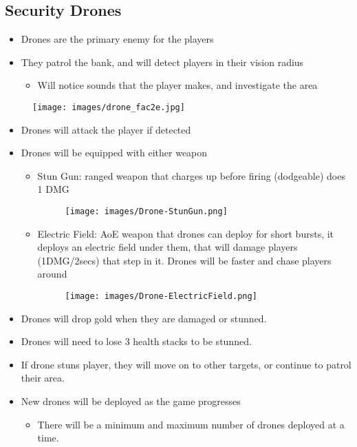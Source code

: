 \documentclass[10pt]{report}
\begin{document}
\subsection{Security Drones}

\begin{minipage}{.8\linewidth}
    \begin{itemize}
        \item Drones are the primary enemy for the players
        \item They patrol the bank, and will detect players in their vision radius
        \begin{itemize}
            \item Will notice sounds that the player makes, and investigate the area 
        \end{itemize}
    \end{itemize}
\end{minipage} \hfill
\begin{minipage}{.18\linewidth}
    \begin{figure}[H]
        \centering
        \texttt{[image: images/drone\_fac2e.jpg]}
        \caption{}
    \end{figure}
\end{minipage}
\begin{itemize}
    \item Drones will attack the player if detected
    \item Drones will be equipped with either weapon                    
    \begin{itemize}
        \item Stun Gun: ranged weapon that charges up before firing (dodgeable) does 1 DMG
        \begin{figure}[H]
            \centering
            \texttt{[image: images/Drone-StunGun.png]}
        \end{figure}
        \item Electric Field: AoE weapon that drones can deploy for short bursts, it deploys an electric field under them, that will damage  players (1DMG/2secs) that step in it. Drones will be faster and chase players around
        \begin{figure}[H]
            \centering
            \texttt{[image: images/Drone-ElectricField.png]}
        \end{figure}
    \end{itemize}
    \item Drones will drop gold when they are damaged or stunned.
    \item Drones will need to lose 3 health stacks to be stunned.
    \item If drone stuns player, they will move on to other targets, or continue to patrol their area.
    \item New drones will be deployed as the game progresses
    \begin{itemize}
        \item There will be a minimum and maximum number of drones deployed at a time.
    \end{itemize}
\end{itemize}
\end{document}
